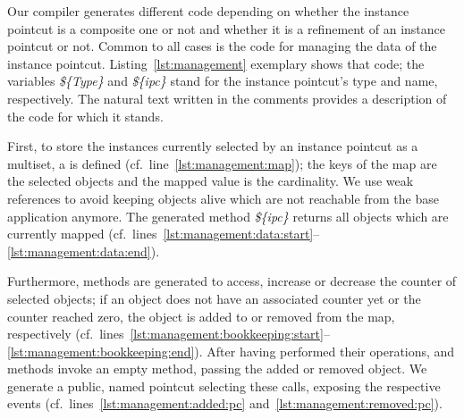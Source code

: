 Our compiler generates different code depending on whether the instance pointcut is a composite one or not and whether it is a refinement of an instance pointcut or not.
Common to all cases is the code for managing the data of the instance pointcut.
Listing~\ref{lst:management} exemplary shows that code; the variables \emph{\$\{Type\}} and \emph{\$\{ipc\}} stand for the instance pointcut's type and name, respectively.
The natural text written in the comments provides a description of the code for which it stands.

First, to store the instances currently selected by an instance pointcut as a multiset, a  is defined (cf.\ line~\ref{lst:management:map}); the keys of the map are the selected objects and the mapped value is the cardinality.
We use weak references to avoid keeping objects alive which are not reachable from the base application anymore.
The generated method \emph{\$\{ipc\}} returns all objects which are currently mapped (cf.\ lines~\ref{lst:management:data:start}--\ref{lst:management:data:end}).

Furthermore, methods are generated to access, increase or decrease the counter of selected objects; if an object does not have an associated counter yet or the counter reached zero, the object is added to or removed from the map, respectively (cf.\ lines~\ref{lst:management:bookkeeping:start}--\ref{lst:management:bookkeeping:end}).
After having performed their operations,  and  methods invoke an empty method, passing the added or removed object.
We generate a public, named pointcut selecting these calls, exposing the respective events (cf.\ lines~\ref{lst:management:added:pc} and~\ref{lst:management:removed:pc}).

